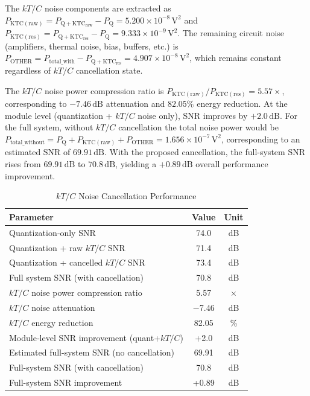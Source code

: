 \documentclass[journal]{IEEEtran}
\begin{document}
The $kT/C$ noise components are extracted as $P_\mathrm{KTC(raw)} = P_\mathrm{Q+KTC_{raw}} - P_\mathrm{Q} = 5.200\times 10^{-8}\,\mathrm{V^2}$ and $P_\mathrm{KTC(res)} = P_\mathrm{Q+KTC_{res}} - P_\mathrm{Q} = 9.333\times 10^{-9}\,\mathrm{V^2}$. The remaining circuit noise (amplifiers, thermal noise, bias, buffers, etc.) is $P_\mathrm{OTHER} = P_\mathrm{total\_with} - P_\mathrm{Q+KTC_{res}} = 4.907\times 10^{-8}\,\mathrm{V^2}$, which remains constant regardless of $kT/C$ cancellation state.

The $kT/C$ noise power compression ratio is $P_\mathrm{KTC(raw)}/P_\mathrm{KTC(res)} = 5.57\times$, corresponding to $-7.46\,\mathrm{dB}$ attenuation and $82.05\%$ energy reduction. At the module level (quantization + $kT/C$ noise only), SNR improves by $+2.0\,\mathrm{dB}$. For the full system, without $kT/C$ cancellation the total noise power would be $P_\mathrm{total\_without} = P_\mathrm{Q} + P_\mathrm{KTC(raw)} + P_\mathrm{OTHER} = 1.656\times 10^{-7}\,\mathrm{V^2}$, corresponding to an estimated SNR of $69.91\,\mathrm{dB}$. With the proposed cancellation, the full-system SNR rises from $69.91\,\mathrm{dB}$ to $70.8\,\mathrm{dB}$, yielding a $+0.89\,\mathrm{dB}$ overall performance improvement.

\begin{table}[!t]
\centering
\caption{$kT/C$ Noise Cancellation Performance}
\label{tab:ktc_cancellation}
\begin{tabular}{|l|c|c|}
\hline
\textbf{Parameter} & \textbf{Value} & \textbf{Unit} \\
\hline
Quantization‑only SNR & 74.0 & dB \\
Quantization + raw $kT/C$ SNR & 71.4 & dB \\
Quantization + cancelled $kT/C$ SNR & 73.4 & dB \\
Full system SNR (with cancellation) & 70.8 & dB \\
\hline
$kT/C$ noise power compression ratio & 5.57 & $\times$ \\
$kT/C$ noise attenuation & $-$7.46 & dB \\
$kT/C$ energy reduction & 82.05 & \% \\
Module‑level SNR improvement (quant+$kT/C$) & +2.0 & dB \\
Estimated full-system SNR (no cancellation) & 69.91 & dB \\
Full-system SNR (with cancellation) & 70.8 & dB \\
Full-system SNR improvement & +0.89 & dB \\
\hline
\end{tabular}
\end{table}
\end{document}
